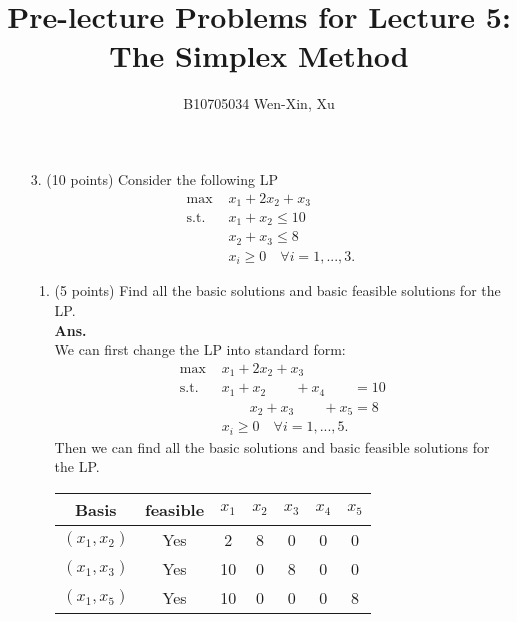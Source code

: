 \documentclass[12pt]{article}
\title{Pre-lecture Problems for Lecture 5:\\
The Simplex Method}
\author{B10705034 Wen-Xin, Xu}
\begin{document}
\maketitle
\begin{enumerate}
    \item[3.] (10 points) Consider the following LP
        \begin{align*}
            \text{max }  & x_1 + 2x_2 + x_3                       \\
            \text{s.t. } & x_1 + x_2 \leq 10                      \\
                         & x_2 + x_3 \leq 8                       \\
                         & x_i \geq 0 \quad \forall i = 1, ...,3.
        \end{align*}
        \begin{enumerate}
            \item (5 points) Find all the basic solutions and basic feasible solutions for the LP.\\
                  \textbf{Ans. }\\
                  We can first change the LP into standard form:
                  \begin{align*}
                      \text{max }  & x_1 + 2x_2 + x_3                           \\
                      \text{s.t. } & x_1 + x_2  \quad\quad +x_4 \quad\quad = 10 \\
                                   & \quad \quad x_2 + x_3 \quad \quad +x_5 = 8 \\
                                   & x_i \geq 0 \quad \forall i = 1, ...,5.
                  \end{align*}
                  Then we can find all the basic solutions and basic feasible solutions for the LP.
                  \begin{table}[H]
                      \centering
                      \begin{tabular}{|c|c|c|c|c|c|c|}
                          \hline
                          Basis       & feasible & $x_1$ & $x_2$ & $x_3$ & $x_4$ & $x_5$ \\
                          \hline
                          $(x_1,x_2)$ & Yes      & 2     & 8     & 0     & 0     & 0     \\
                          $(x_1,x_3)$ & Yes      & 10    & 0     & 8     & 0     & 0     \\
                          $(x_1,x_5)$ & Yes      & 10    & 0     & 0     & 0     & 8     \\

\end{tabular}
\end{table}
\end{enumerate}
\end{enumerate}
\end{document}
